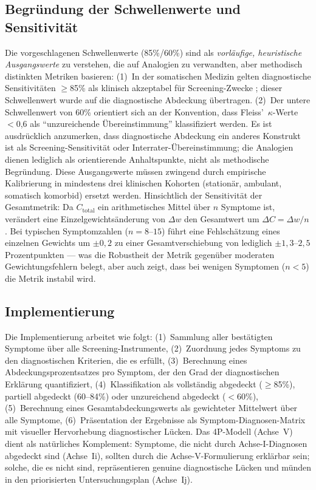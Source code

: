 \documentclass[11pt,a4paper]{article}
\begin{document}
\subsection{Begr\"undung der Schwellenwerte und Sensitivit\"at}

Die vorgeschlagenen Schwellenwerte (85\%/60\%) sind als \textit{vorl\"aufige, heuristische Ausgangswerte} zu verstehen, die auf Analogien zu verwandten, aber methodisch distinkten Metriken basieren: (1)~In der somatischen Medizin gelten diagnostische Sensitivit\"aten $\geq$85\% als klinisch akzeptabel f\"ur Screening-Zwecke \citep{Levis2019}; dieser Schwellenwert wurde auf die diagnostische Abdeckung \"ubertragen. (2)~Der untere Schwellenwert von 60\% orientiert sich an der Konvention, dass Fleiss'~$\kappa$-Werte $<$0,6 als ``unzureichende \"Ubereinstimmung'' klassifiziert werden. Es ist ausdr\"ucklich anzumerken, dass diagnostische Abdeckung ein anderes Konstrukt ist als Screening-Sensitivit\"at oder Interrater-\"Ubereinstimmung; die Analogien dienen lediglich als orientierende Anhaltspunkte, nicht als methodische Begr\"undung. Diese Ausgangswerte m\"ussen zwingend durch empirische Kalibrierung in mindestens drei klinischen Kohorten (station\"ar, ambulant, somatisch komorbid) ersetzt werden. Hinsichtlich der Sensitivit\"at der Gesamtmetrik: Da $C_{\text{total}}$ ein arithmetisches Mittel \"uber $n$ Symptome ist, ver\"andert eine Einzelgewichts\"anderung von $\Delta w$ den Gesamtwert um $\Delta C = \Delta w / n$. Bei typischen Symptomzahlen ($n = 8$--$15$) f\"uhrt eine Fehlsch\"atzung eines einzelnen Gewichts um $\pm 0{,}2$ zu einer Gesamtverschiebung von lediglich $\pm 1{,}3$--$2{,}5$ Prozentpunkten --- was die Robustheit der Metrik gegen\"uber moderaten Gewichtungsfehlern belegt, aber auch zeigt, dass bei wenigen Symptomen ($n < 5$) die Metrik instabil wird.

\subsection{Implementierung}

Die Implementierung arbeitet wie folgt: (1)~Sammlung aller best\"atigten Symptome \"uber alle Screening-Instrumente, (2)~Zuordnung jedes Symptoms zu den diagnostischen Kriterien, die es erf\"ullt, (3)~Berechnung eines Abdeckungsprozentsatzes pro Symptom, der den Grad der diagnostischen Erkl\"arung quantifiziert, (4)~Klassifikation als vollst\"andig abgedeckt ($\geq$85\%), partiell abgedeckt (60--84\%) oder unzureichend abgedeckt ($<$60\%), (5)~Berechnung eines Gesamtabdeckungswerts als gewichteter Mittelwert \"uber alle Symptome, (6)~Pr\"asentation der Ergebnisse als Symptom-Diagnosen-Matrix mit visueller Hervorhebung diagnostischer L\"ucken. Das 4P-Modell (Achse~V) dient als nat\"urliches Komplement: Symptome, die nicht durch Achse-I-Diagnosen abgedeckt sind (Achse~Ii), sollten durch die Achse-V-Formulierung erkl\"arbar sein; solche, die es nicht sind, repr\"asentieren genuine diagnostische L\"ucken und m\"unden in den priorisierten Untersuchungsplan (Achse~Ij).
\end{document}
